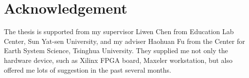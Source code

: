\section{Acknowledgement}

The thesis is supported from my supervisor Liwen Chen from Education Lab
Center, Sun Yat-sen University, and my adviser Haohuan Fu from the Center
for Earth System Science, Tsinghua University. They supplied me not only the
hardware device, such as Xilinx FPGA board, Maxeler workstation, but also
offered me lots of suggestion in the past several months.
